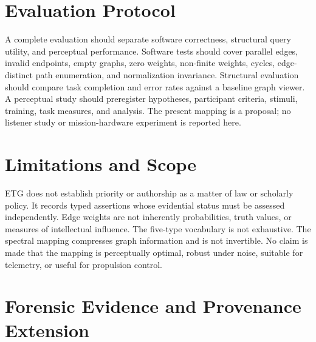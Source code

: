 \documentclass[11pt]{article}
\begin{document}
\section{Evaluation Protocol}
A complete evaluation should separate software correctness, structural query utility, and perceptual performance. Software tests should cover parallel edges, invalid endpoints, empty graphs, zero weights, non-finite weights, cycles, edge-distinct path enumeration, and normalization invariance. Structural evaluation should compare task completion and error rates against a baseline graph viewer. A perceptual study should preregister hypotheses, participant criteria, stimuli, training, task measures, and analysis. The present mapping is a proposal; no listener study or mission-hardware experiment is reported here.
\section{Limitations and Scope}
ETG does not establish priority or authorship as a matter of law or scholarly policy. It records typed assertions whose evidential status must be assessed independently. Edge weights are not inherently probabilities, truth values, or measures of intellectual influence. The five-type vocabulary is not exhaustive. The spectral mapping compresses graph information and is not invertible. No claim is made that the mapping is perceptually optimal, robust under noise, suitable for telemetry, or useful for propulsion control.

\section{Forensic Evidence and Provenance Extension}
\end{document}
